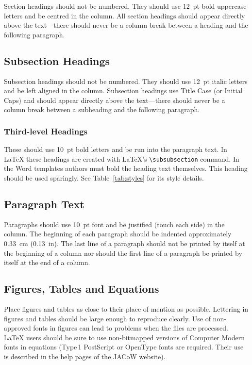 \documentclass[a4paper,
               nospread,     %
               ]{jacow}
\begin{document}
Section headings should not be numbered. They should
use  \SI{12}{pt}  bold  uppercase  letters  and  be  centred  in  the
column. All section headings should appear directly above
the text---there should never be a column break between a heading and the
following paragraph.

\subsection{Subsection Headings}

Subsection  headings  should  not  be  numbered.
They should use \SI{12}{pt} italic letters and be left aligned in the column.
Subsection headings use Title Case (or Initial Caps)
and should appear directly above the text---there should never be a column break
between a subheading and the following paragraph.

\subsubsection{Third-level Headings} These should use \SI{10}{pt} bold
letters and be run into the paragraph text. In \LaTeX{} these headings are
created with \LaTeX's \verb|\subsubsection| command.
In the Word templates authors must bold the heading text themselves.
This heading should be used sparingly. See Table~\ref{tab:styles}
for its style details.

\subsection{Paragraph Text}

Paragraphs should use \SI{10}{pt} font and be justified (touch each side) in
the column. The beginning of each paragraph should be indented
approximately \SI{0.33}{cm} (\SI{0.13}{in}). The last line of a paragraph should not be
printed by itself at the beginning of a column nor should the first line of
a paragraph be printed by itself at the end of a column.

\subsection{Figures, Tables and Equations}

Place figures and tables as close to their place of mention as
possible. Lettering in figures and tables should be large enough to
reproduce clearly. Use of non-approved fonts in figures can lead to
problems when the files are processed. \LaTeX{} users should be sure to use
non-bitmapped versions of Computer Modern fonts in equations (Type\,1 PostScript
or OpenType fonts are required. Their use is described in the help 
pages of the JACoW website\cite{jacow-help}).
\end{document}
